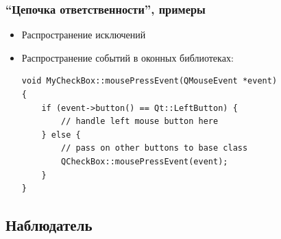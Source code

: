 \documentclass[xetex,mathserif,serif]{beamer}
\begin{document}
    \begin{frame}[fragile]
        \frametitle{``Цепочка ответственности'', примеры}
        \begin{itemize}
            \item Распространение исключений
            \item Распространение событий в оконных библиотеках:
            \begin{verbatim}
void MyCheckBox::mousePressEvent(QMouseEvent *event)
{
    if (event->button() == Qt::LeftButton) {
        // handle left mouse button here
    } else {
        // pass on other buttons to base class
        QCheckBox::mousePressEvent(event);
    }
}
            \end{verbatim}
        \end{itemize}
    \end{frame}

    \subsection{Наблюдатель}
\end{document}
